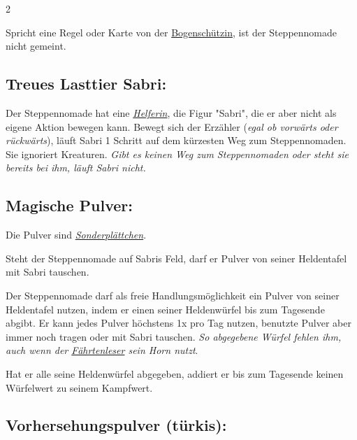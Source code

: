 \documentclass[10pt, a4paper, oneside]{book}
\newcommand{\fan}[1]{\textit{#1}}
\begin{document}
\begin{multicols*}{2}
\begin{nobgcolor}
Spricht eine Regel oder Karte von der \hyperref[bogenschuetzin]{Bogenschützin}, ist der Steppennomade nicht gemeint.



\subsection{Treues Lasttier Sabri:}

Der Steppennomade hat eine \hyperref[helfer]{\fan{Helferin}}, die Figur "Sabri", die er aber nicht als eigene Aktion bewegen kann. Bewegt sich der Erzähler (\fan{egal ob vorwärts oder rückwärts}), läuft Sabri 1 Schritt auf dem kürzesten Weg zum Steppennomaden.
\supercite{mh-steppennomade}
Sie ignoriert Kreaturen.
\supercite{mh-begleitheft}
\fan{Gibt es keinen Weg zum Steppennomaden oder steht sie bereits bei ihm, läuft Sabri nicht.}






\subsection{Magische Pulver:}

Die Pulver sind \hyperref[gegenstaende-und-sonderplaettchen]{\fan{Sonderplättchen}}.

Steht der Steppennomade auf Sabris Feld, darf er Pulver von seiner Heldentafel mit Sabri tauschen.
\supercite{mh-steppennomade,mh-begleitheft}

Der Steppennomade darf als freie Handlungsmöglichkeit ein Pulver von seiner Heldentafel nutzen, indem er einen seiner Heldenwürfel bis zum Tagesende abgibt.
\supercite{mh-begleitheft}
Er kann jedes Pulver höchstens 1x pro Tag nutzen, benutzte Pulver aber immer noch tragen oder mit Sabri tauschen.
\supercite{88552}
\fan{So abgegebene Würfel fehlen ihm, auch wenn der \hyperref[faehrtenleser]{Fährtenleser} sein Horn nutzt}.

Hat er alle seine Heldenwürfel abgegeben, addiert er bis zum Tagesende keinen Würfelwert zu seinem Kampfwert. 



\columnbreak



\subsection{Vorhersehungspulver (türkis):}


\end{nobgcolor}
\end{multicols*}
\end{document}
